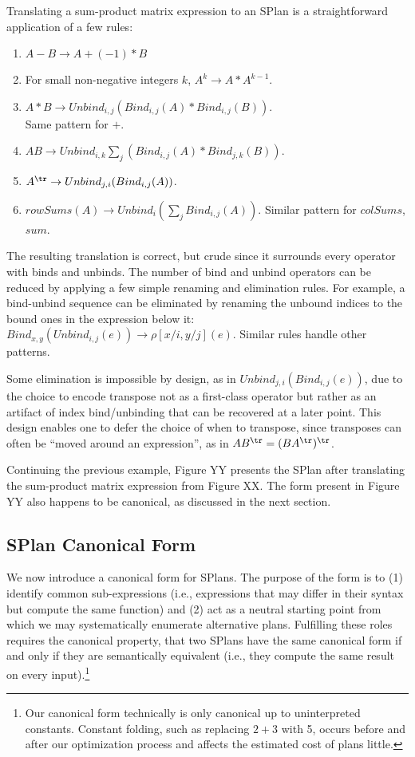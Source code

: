 Translating a sum-product matrix expression to an SPlan is a straightforward application of a few rules:
\begin{enumerate}
  \item $A - B \rightarrow A + (-1) * B$
  \item For small non-negative integers $k$, $A^k \rightarrow A * A^{k-1}$.
  \item $A*B \rightarrow Unbind_{i,j}(Bind_{i,j}(A)*Bind_{i,j}(B))$.  \\Same pattern for $+$.
  \item $AB \rightarrow Unbind_{i,k} \sum_j (Bind_{i,j}(A)*Bind_{j,k}(B))$. 
  \item $A^\tr \rightarrow Unbind_{j,i}(Bind_{i,j}(A))$.
  \item $rowSums(A) \rightarrow Unbind_{i}(\sum_j Bind_{i,j}(A))$.  Similar pattern for $colSums$, $sum$.
\end{enumerate}
The resulting translation is correct, but crude since it surrounds every operator with binds and unbinds.  
The number of bind and unbind operators can be reduced by applying a few simple renaming and elimination rules.
For example, a bind-unbind sequence can be eliminated by renaming the unbound indices to the bound ones in the expression below it: $Bind_{x,y}(Unbind_{i,j}(e)) \rightarrow \rho[x/i, y/j](e)$.
Similar rules handle other patterns.  

Some elimination is impossible by design, as in $Unbind_{j,i}(Bind_{i,j}(e))$, due to the choice to encode transpose not as a first-class operator but rather as an artifact of index bind/unbinding that can be recovered at a later point. This design enables one to defer the choice of when to transpose, since transposes can often be ``moved around an expression'', as in $AB^\tr = (BA^\tr)^\tr$.

Continuing the previous example, Figure YY presents the SPlan after translating the sum-product matrix expression from Figure XX.
The form present in Figure YY also happens to be canonical, as discussed in the next section.



\subsection{SPlan Canonical Form}
We now introduce a canonical form for SPlans.
The purpose of the form is to (1) identify common sub-expressions (i.e., expressions that may differ in their syntax but compute the same function) and (2) act as a neutral starting point from which we may systematically enumerate alternative plans.  Fulfilling these roles requires the canonical property, that two SPlans have the same canonical form if and only if they are semantically equivalent (i.e., they compute the same result on every input).\footnote{Our canonical form technically is only canonical up to uninterpreted constants. Constant folding, such as replacing $2 + 3$ with 5, occurs before and after our optimization process and affects the estimated cost of plans little.}

